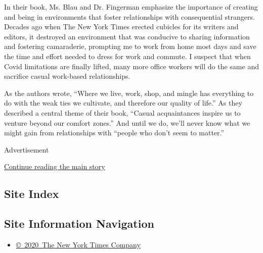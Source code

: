 In their book, Ms. Blau and Dr. Fingerman emphasize the importance of
creating and being in environments that foster relationships with
consequential strangers. Decades ago when The New York Times erected
cubicles for its writers and editors, it destroyed an environment that
was conducive to sharing information and fostering camaraderie,
prompting me to work from home most days and save the time and effort
needed to dress for work and commute. I suspect that when Covid
limitations are finally lifted, many more office workers will do the
same and sacrifice casual work-based relationships.

As the authors wrote, ``Where we live, work, shop, and mingle has
everything to do with the weak ties we cultivate, and therefore our
quality of life.'' As they described a central theme of their book,
``Casual acquaintances inspire us to venture beyond our comfort zones.''
And until we do, we'll never know what we might gain from relationships
with ``people who don't seem to matter.''

Advertisement

\protect\hyperlink{after-bottom}{Continue reading the main story}

\hypertarget{site-index}{%
\subsection{Site Index}\label{site-index}}

\hypertarget{site-information-navigation}{%
\subsection{Site Information
Navigation}\label{site-information-navigation}}

\begin{itemize}
\tightlist
\item
  \href{https://help.nytimes3xbfgragh.onion/hc/en-us/articles/115014792127-Copyright-notice}{©~2020~The
  New York Times Company}
\end{itemize}

